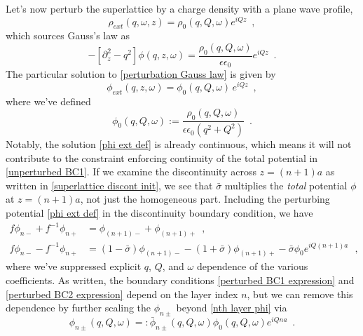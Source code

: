 \documentclass[submission, Phys]{SciPost}
\newcommand{\lp}{\left(}
\newcommand{\lb}{\left[}
\newcommand{\rb}{\right]}
\newcommand{\rp}{\right)}
\newcommand{\e}{\epsilon}
\begin{document}
Let's now perturb the superlattice by a charge density with a plane wave profile,
\begin{equation}
    \label{rho ext}
    \rho_{ext}(q,\omega,z) = \rho_0(q,Q,\omega) e^{i Q z}
    \,\,\,,
\end{equation}
which sources Gauss's law as
\begin{equation}
    \label{perturbation Gauss law}
    -\lb\partial_z^2-q^2\rb\phi(q,z,\omega) = \frac{\rho_0(q,Q,\omega)}{\e\e_0} e^{i Q z}
    \,\,\,.
\end{equation}
The particular solution to \eqref{perturbation Gauss law} is given by
\begin{equation}
    \label{phi ext def}
    \phi_{ext}(q,z,\omega) = \phi_0(q,Q,\omega)\, e^{i Q z}
    \,\,\,,
\end{equation}
where we've defined
\begin{equation}
    \label{phi0 def}
    \phi_0(q,Q,\omega) := \frac{\rho_0(q,Q,\omega)}{\e\e_0\lp q^2+Q^2\rp}
    \,\,\,.
\end{equation}
Notably, the solution \eqref{phi ext def} is already continuous, which means it will not contribute to the constraint enforcing continuity of the total potential in \eqref{unperturbed BC1}.  If we examine the discontinuity across $z=(n+1)a$ as written in \eqref{superlattice discont init}, we see that $\bar\sigma$ multiplies the {\it total} potential $\phi$ at $z=(n+1)a$, not just the homogeneous part.  Including the perturbing potential \eqref{phi ext def} in the discontinuity boundary condition, we have
\begin{align}
    \label{perturbed BC1 expression}
    f \phi_{n-} + f^{-1}\phi_{n+} &= \phi_{(n+1)-} + \phi_{(n+1)+}
    \,\,\,,
    \\
    \label{perturbed BC2 expression}
    f \phi_{n-} - f^{-1}\phi_{n+} &= (1-\bar\sigma)\phi_{(n+1)-}-(1+\bar\sigma)\phi_{(n+1)+} - \bar\sigma \phi_0 e^{i Q(n+1)a}
    \,\,\,\,,
\end{align}
where we've suppressed explicit $q$, $Q$, and $\omega$ dependence of the various coefficients.  As written, the boundary conditions \eqref{perturbed BC1 expression} and \eqref{perturbed BC2 expression} depend on the layer index $n$, but we can remove this dependence by further scaling the $\phi_{n\pm}$ beyond \eqref{nth layer phi} via
\begin{equation}
    \label{Q scaled phi pm}
    \phi_{n\pm}(q,Q,\omega) =: \bar\phi_{n\pm}(q,Q,\omega) \phi_0(q,Q,\omega) e^{i Q n a}
    \,\,\,.
\end{equation}
\end{document}
